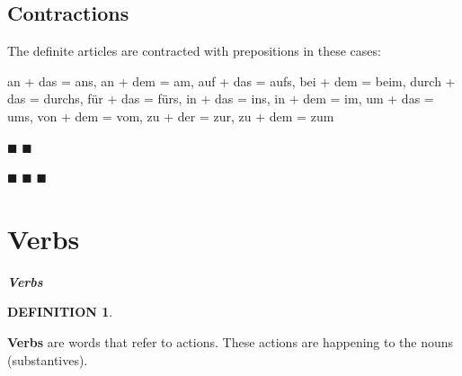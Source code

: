\documentclass[a4paper,twocolumn,10pt]{article}
\newtheorem{mydef}{DEFINITION}[section]
\newcommand{\subsectionend}
{\nolinenumbers \begin{center} $\blacksquare$ \hspace{0.2cm} $\blacksquare$ \end{center} \linenumbers}
\newcommand{\sectionend}
{\nolinenumbers \begin{center} $\blacksquare$ \hspace{0.2cm} $\blacksquare$ \hspace{0.2cm} $\blacksquare$ \end{center} \linenumbers \clearpage}
\begin{document}
\linenumbers




\subsection{Contractions}
\label{ssec:contractions}



The definite articles are contracted with prepositions in these cases:

an + das = ans, an + dem = am, auf + das = aufs, bei + dem = beim, durch + das =
durchs, für + das = fürs, in + das = ins, in + dem = im, um + das = ums, von +
dem = vom, zu + der = zur, zu + dem = zum

\subsectionend



\sectionend


\section{{Verbs}}
\label{sec:verbs}



\vspace{0.2cm}
\centering
\nolinenumbers
\begin{defn-bg}

\label{def:verbs_infinitives}
	\begin{defn-title}[width=7cm]{}
		{\normalsize \textbf{\textit{Verbs}} }
	\end{defn-title}

	\begin{defn-theword}
	{
		\footnotesize \begin{mydef} \end{mydef}
	}
	\end{defn-theword}

	\begin{defn-content}
		\justify
	
\textbf {Verbs} are words that refer to actions. These actions are happening to
the nouns (substantives).

	\end{defn-content}

\end{defn-bg}
\end{document}
